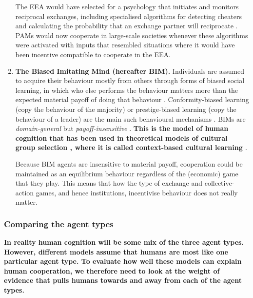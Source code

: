 \documentclass[10pt, a4paper, fleqn]{article}
\begin{document}
\begin{enumerate}

The EEA would have selected for a psychology that initiates and monitors reciprocal exchanges, including specialised algorithms for detecting cheaters and calculating the probability that an exchange partner will reciprocate \citep{Cosmides:1992:a}. PAMs would now cooperate in large-scale societies whenever these algorithms were activated with inputs that resembled situations where it would have been incentive compatible to cooperate in the EEA.


\item \textbf{The Biased Imitating Mind (hereafter BIM).} Individuals are assumed to acquire their behaviour mostly from others through forms of biased social learning, in which who else performs the behaviour matters more than the expected material payoff of doing that behaviour \citep{Henrich:2003:a,Richerson:2005:a,Henrich:2016:a}. Conformity-biased learning (copy the behaviour of the majority) or prestige-biased learning (copy the behaviour of a leader) are the main such behavioural mechanisms \citep{Henrich:2001:b,Richerson:2005:a,Boyd:2011:a}. BIMs are \textit{domain-general} but \textit{payoff-insensitive} \citep{Henrich:2004:a}. \textbf{This is the model of human cognition that has been used in theoretical models of cultural group selection \citep{Boyd:1985:a,Henrich:2001:a,Henrich:2004:aa,Andresguzman:2007:a,Boyd:2011:a}, where it is called context-based cultural learning \citep{Henrich:2003:a,Richerson:2005:a}}.  

Because BIM agents are insensitive to material payoff, cooperation could be maintained as an equilibrium behaviour regardless of the (economic) game that they play. This means that how the type of exchange and collective-action games, and hence institutions, incentivise behaviour does not really matter.

\end{enumerate}

\subsubsection*{Comparing the agent types}

\textbf{In reality human cognition will be some mix of the three agent types. However, different models assume that humans are most like one particular agent type. To evaluate how well these models can explain human cooperation, we therefore need to look at the weight of evidence that pulls humans towards and away from each of the agent types.}
\end{document}
